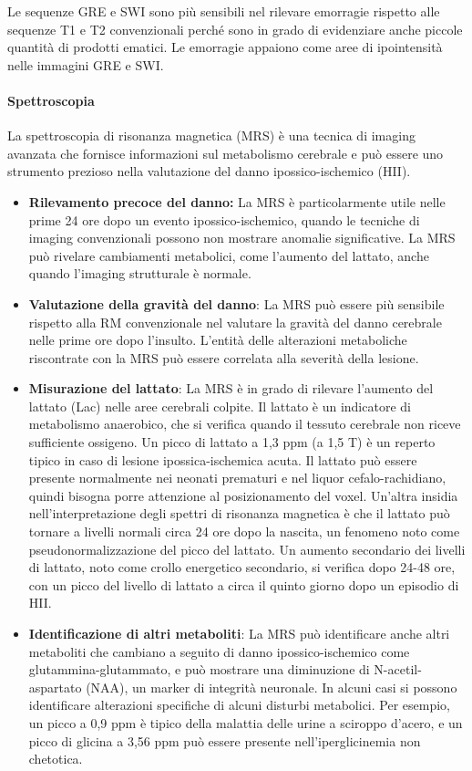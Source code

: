 Le sequenze GRE e SWI sono più sensibili nel rilevare emorragie rispetto alle sequenze T1 e T2 convenzionali perché sono in grado di evidenziare anche piccole quantità di prodotti ematici. Le emorragie appaiono come aree di ipointensità nelle immagini GRE e SWI.

\paragraph{Spettroscopia} La spettroscopia di risonanza magnetica (MRS) è una tecnica di imaging avanzata che fornisce informazioni sul metabolismo cerebrale e può essere uno strumento prezioso nella valutazione del danno ipossico-ischemico (HII).

\begin{itemize}
	\tightlist
	\item
	\textbf{Rilevamento precoce del danno:} La MRS è particolarmente utile nelle prime 24 ore dopo un evento ipossico-ischemico, quando le tecniche di imaging convenzionali possono non mostrare anomalie significative. La MRS può rivelare cambiamenti metabolici, come l'aumento del lattato, anche quando l'imaging strutturale è normale.
	\item
	\textbf{Valutazione della gravità del danno}: La MRS può essere più sensibile rispetto alla RM convenzionale nel valutare la gravità del danno cerebrale nelle prime ore dopo l'insulto. L'entità delle alterazioni metaboliche riscontrate con la MRS può essere correlata alla severità della lesione.
	\item
	\textbf{Misurazione del lattato}: La MRS è in grado di rilevare l'aumento del lattato (Lac) nelle aree cerebrali colpite. Il lattato è un indicatore di metabolismo anaerobico, che si verifica quando il tessuto cerebrale non riceve sufficiente ossigeno. Un picco di lattato a 1,3 ppm (a 1,5 T) è un reperto tipico in caso di lesione ipossica-ischemica acuta. Il lattato può essere presente normalmente nei neonati prematuri e nel liquor cefalo-rachidiano, quindi bisogna porre attenzione al posizionamento del voxel. Un'altra insidia nell'interpretazione degli spettri di risonanza magnetica è che il lattato può tornare a livelli normali circa 24 ore dopo la nascita, un fenomeno noto come pseudonormalizzazione del picco del lattato. Un aumento secondario dei livelli di lattato, noto come crollo energetico secondario, si verifica dopo 24-48 ore, con un picco del livello di lattato a circa il quinto giorno dopo un episodio di HII.
	\item
	\textbf{Identificazione di altri metaboliti}: La MRS può identificare anche altri metaboliti che cambiano a seguito di danno ipossico-ischemico come glutammina-glutammato, e può mostrare una diminuzione di N-acetil-aspartato (NAA), un marker di integrità neuronale. In alcuni casi si possono identificare alterazioni specifiche di alcuni disturbi metabolici. Per esempio, un picco a 0,9 ppm è tipico della malattia delle urine a sciroppo d'acero, e un picco di glicina a 3,56 ppm può essere presente nell'iperglicinemia non chetotica.

\end{itemize}
